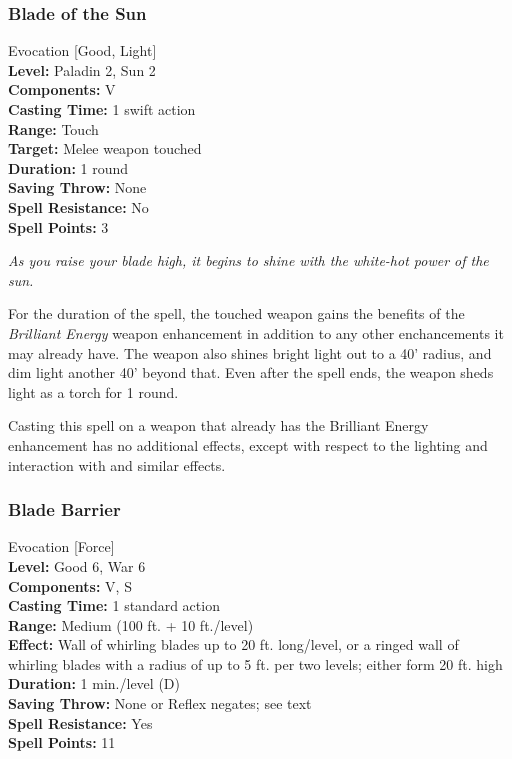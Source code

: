 \subsubsection{Blade of the Sun}
\label{Spell:BladeOfTheSun}
Evocation [Good, Light]
\\ \textbf{Level:} Paladin 2, Sun 2
\\ \textbf{Components:} V
\\ \textbf{Casting Time:} 1 swift action
\\ \textbf{Range:} Touch
\\ \textbf{Target:} Melee weapon touched
\\ \textbf{Duration:} 1 round
\\ \textbf{Saving Throw:} None
\\ \textbf{Spell Resistance:} No
\\ \textbf{Spell Points:} 3

\emph{As you raise your blade high, it begins to shine with the white-hot power of the sun.}

For the duration of the spell, the touched weapon gains the benefits of the \emph{Brilliant Energy} weapon enhancement in addition to any other enchancements it may already have.
The weapon also shines bright light out to a 40' radius, and dim light another 40' beyond that. 
Even after the spell ends, the weapon sheds light as a torch for 1 round.

Casting this spell on a weapon that already has the Brilliant Energy enhancement has no additional effects, 
except with respect to the lighting and interaction with  and similar effects.
\subsubsection{Blade Barrier}
\label{Spell:BladeBarrier}
Evocation [Force]
\\ \textbf{Level:} Good 6, War 6
\\ \textbf{Components:} V, S
\\ \textbf{Casting Time:} 1 standard action
\\ \textbf{Range:} Medium (100 ft. + 10 ft./level)
\\ \textbf{Effect:} Wall of whirling blades up to 20 ft. long/level, or a ringed wall of whirling blades with a radius of up to 5 ft. per two levels; either form 20 ft. high
\\ \textbf{Duration:} 1 min./level (D)
\\ \textbf{Saving Throw:} None or Reflex negates; see text
\\ \textbf{Spell Resistance:} Yes
\\ \textbf{Spell Points:} 11

